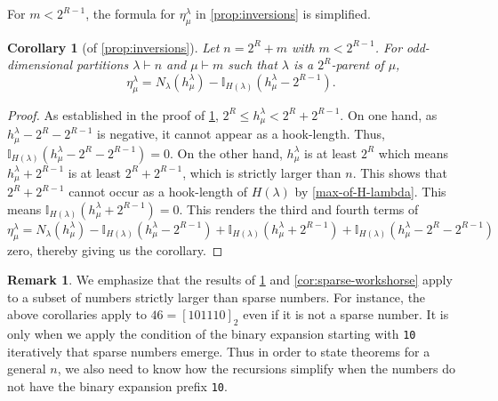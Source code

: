 \documentclass[12pt]{amsart}
\newtheorem{corollary}[theorem]{Corollary}
\theoremstyle{definition}
\newtheorem{remark}[theorem]{Remark}
\numberwithin{equation}{section}
\newcommand{\la}{\lambda}
\begin{document}
For $m < 2^{R-1}$, the formula for $\eta^\la_\mu$ in \cref{prop:inversions} is simplified.
\begin{corollary}[of \cref{prop:inversions}]\label{cor:inversions}
Let $n = 2^R + m$ with $m < 2^{R-1}$. For odd-dimensional partitions $\lambda \vdash n$ and $\mu\vdash m$ such that $\lambda$ is a $2^R$-parent of $\mu$,
\[
\eta^{\lambda}_{\mu} = N_{\lambda}(h^\lambda_\mu) - \mathbb{I}_{H(\lambda)}(h^\lambda_\mu - 2^{R-1}).
\]
\end{corollary}
\begin{proof}
As established in the proof of \cref{cor:inversions}, $2^R \leq h^\lambda_\mu < 2^R + 2^{R-1}$. On one hand, as $ h^\lambda_\mu - 2^R - 2^{R-1}$ is negative, it cannot appear as a hook-length. Thus, $\mathbb{I}_{H(\lambda)}(h^\lambda_\mu - 2^R - 2^{R-1}) = 0$. On the other hand, $h^\lambda_\mu$ is at least $2^R$ which means $h_\mu^\la + 2^{R-1}$ is at least  $2^R+ 2^{R-1}$, which is strictly larger than $n$. This shows that $2^R + 2^{R-1}$ cannot occur as a hook-length of $H(\la)$ by \cref{max-of-H-lambda}. This means $\mathbb{I}_{H(\lambda)}(h^\lambda_\mu + 2^{R-1}) = 0$. This renders the third and fourth terms of $\eta^{\lambda}_{\mu} = N_{\lambda}(h^\lambda_\mu) - \mathbb{I}_{H(\lambda)}(h^\lambda_\mu - 2^{R-1}) +  \mathbb{I}_{H(\lambda)}(h^\lambda_\mu + 2^{R-1}) + \mathbb{I}_{H(\lambda)}(h^\lambda_\mu - 2^R- 2^{R-1})$ zero, thereby giving us the corollary. 
\end{proof}
\begin{remark}
    We emphasize that the results of \cref{cor:inversions} and \cref{cor:sparse-workshorse} apply to a subset of numbers strictly larger than sparse numbers. For instance, the above corollaries apply to $46 = [101110]_2$ even if it is not a sparse number. It is only when we apply the condition of the binary expansion starting with \texttt{10} iteratively that sparse numbers emerge. Thus in order to state theorems for a general $n$, we also need to know how the recursions simplify when the numbers do not have the binary expansion prefix \texttt{10}.
\end{remark}
\end{document}
